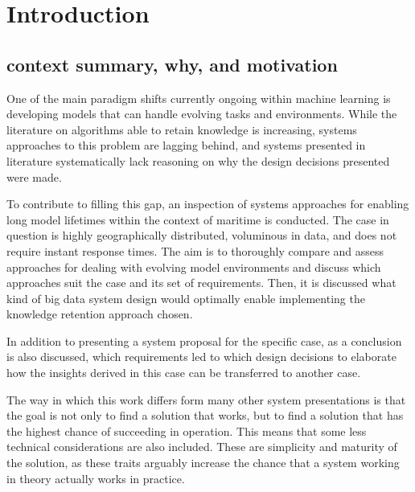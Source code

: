 \chapter{Introduction}

\section{context summary, why, and motivation}

One of the main paradigm shifts currently ongoing within machine learning is developing models that can handle evolving tasks and environments. While the literature on algorithms able to retain knowledge is increasing, systems approaches to this problem are lagging behind, and systems presented in literature systematically lack reasoning on why the design decisions presented were made.

To contribute to filling this gap, an inspection of systems approaches for enabling long model lifetimes within the context of maritime is conducted. The case in question is highly geographically distributed, voluminous in data, and does not require instant response times. The aim is to thoroughly compare and assess approaches for dealing with evolving model environments and discuss which approaches suit the case and its set of requirements. Then, it is discussed what kind of big data system design would optimally enable implementing the knowledge retention approach chosen.

In addition to presenting a system proposal for the specific case, as a conclusion is also discussed, which requirements led to which design decisions to elaborate how the insights derived in this case can be transferred to another case.

The way in which this work differs form many other system presentations is that the goal is not only to find a solution that works, but to find a solution that has the highest chance of succeeding in operation. This means that some less technical considerations are also included. These are simplicity and maturity of the solution, as these traits arguably increase the chance that a system working in theory actually works in practice.




